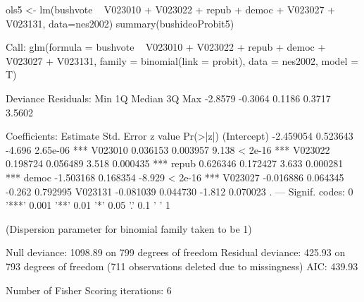 \begin{Schunk}
\begin{Sinput}
 ols5 <- lm(bushvote ~ V023010 + V023022 + repub + democ + V023027 + V023131, data=nes2002)
 summary(bushideoProbit5)
\end{Sinput}
\begin{Soutput}
Call:
glm(formula = bushvote ~ V023010 + V023022 + repub + democ + 
    V023027 + V023131, family = binomial(link = probit), data = nes2002, 
    model = T)

Deviance Residuals: 
    Min       1Q   Median       3Q      Max  
-2.8579  -0.3064   0.1186   0.3717   3.5602  

Coefficients:
             Estimate Std. Error z value Pr(>|z|)    
(Intercept) -2.459054   0.523643  -4.696 2.65e-06 ***
V023010      0.036153   0.003957   9.138  < 2e-16 ***
V023022      0.198724   0.056489   3.518 0.000435 ***
repub        0.626346   0.172427   3.633 0.000281 ***
democ       -1.503168   0.168354  -8.929  < 2e-16 ***
V023027     -0.016886   0.064345  -0.262 0.792995    
V023131     -0.081039   0.044730  -1.812 0.070023 .  
---
Signif. codes:  0 '***' 0.001 '**' 0.01 '*' 0.05 '.' 0.1 ' ' 1

(Dispersion parameter for binomial family taken to be 1)

    Null deviance: 1098.89  on 799  degrees of freedom
Residual deviance:  425.93  on 793  degrees of freedom
  (711 observations deleted due to missingness)
AIC: 439.93

Number of Fisher Scoring iterations: 6
\end{Soutput}
\end{Schunk}
